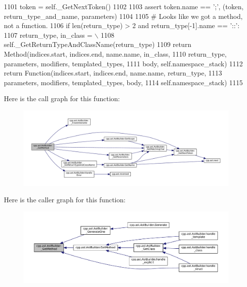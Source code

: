 \begin{DoxyCode}
1101                 token = self.\_GetNextToken()
1102 
1103             \textcolor{keyword}{assert} token.name == \textcolor{stringliteral}{';'}, (token, return\_type\_and\_name, parameters)
1104 
1105         \textcolor{comment}{# Looks like we got a method, not a function.}
1106         \textcolor{keywordflow}{if} len(return\_type) > 2 \textcolor{keywordflow}{and} return\_type[-1].name == \textcolor{stringliteral}{'::'}:
1107             return\_type, in\_class = \(\backslash\)
1108                          self.\_GetReturnTypeAndClassName(return\_type)
1109             \textcolor{keywordflow}{return} Method(indices.start, indices.end, name.name, in\_class,
1110                           return\_type, parameters, modifiers, templated\_types,
1111                           body, self.namespace\_stack)
1112         \textcolor{keywordflow}{return} Function(indices.start, indices.end, name.name, return\_type,
1113                         parameters, modifiers, templated\_types, body,
1114                         self.namespace\_stack)
1115 
\end{DoxyCode}
Here is the call graph for this function\+:
\nopagebreak
\begin{figure}[H]
\begin{center}
\leavevmode
\includegraphics[width=350pt]{classcpp_1_1ast_1_1AstBuilder_ad1d43eb0d4bdc6be1a9d7ff86c54bd66_cgraph}
\end{center}
\end{figure}
Here is the caller graph for this function\+:
\nopagebreak
\begin{figure}[H]
\begin{center}
\leavevmode
\includegraphics[width=350pt]{classcpp_1_1ast_1_1AstBuilder_ad1d43eb0d4bdc6be1a9d7ff86c54bd66_icgraph}
\end{center}
\end{figure}
\mbox{\label{classcpp_1_1ast_1_1AstBuilder_a5d691eeae461945d88601fc2f2dce3cb}} 
